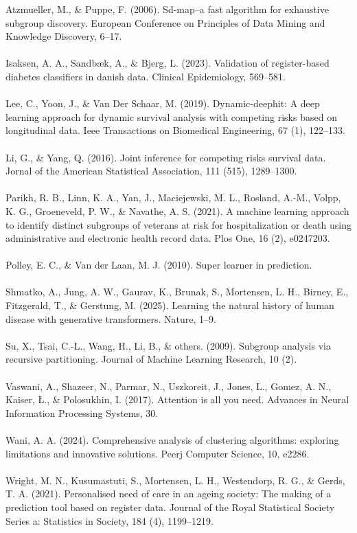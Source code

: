 \documentclass[11pt]{article}
\author{Hjalte Søberg Mikkelsen}
\date{\today}
\title{}
\begin{document}
\noindent
Atzmueller, M., \& Puppe, F. (2006). Sd-map–a fast algorithm for exhaustive
subgroup discovery. European Conference on Principles of Data Mining and
Knowledge Discovery, 6–17.\\[0pt]
\\[0pt]
Isaksen, A. A., Sandbæk, A., \& Bjerg, L. (2023). Validation of register-based
diabetes classifiers in danish data. Clinical Epidemiology, 569–581.\\[0pt]
\\[0pt]
Lee, C., Yoon, J., \& Van Der Schaar, M. (2019). Dynamic-deephit: A deep
learning approach for dynamic survival analysis with competing risks based
on longitudinal data. Ieee Transactions on Biomedical Engineering, 67 (1),
122–133.\\[0pt]
\\[0pt]
Li, G., \& Yang, Q. (2016). Joint inference for competing risks survival data.
Jornal of the American Statistical Association, 111 (515), 1289–1300.\\[0pt]
\\[0pt]
Parikh, R. B., Linn, K. A., Yan, J., Maciejewski, M. L., Rosland, A.-M., Volpp,
K. G., Groeneveld, P. W., \& Navathe, A. S. (2021). A machine learning
approach to identify distinct subgroups of veterans at risk for hospitalization
or death using administrative and electronic health record data. Plos One,
16 (2), e0247203.\\[0pt]
\\[0pt]
Polley, E. C., \& Van der Laan, M. J. (2010). Super learner in prediction.\\[0pt]
\\[0pt]
Shmatko, A., Jung, A. W., Gaurav, K., Brunak, S., Mortensen, L. H., Birney,
E., Fitzgerald, T., \& Gerstung, M. (2025). Learning the natural history of
human disease with generative transformers. Nature, 1–9.\\[0pt]
\\[0pt]
Su, X., Tsai, C.-L., Wang, H., Li, B., \& others. (2009). Subgroup analysis via
recursive partitioning. Journal of Machine Learning Research, 10 (2).\\[0pt]
\\[0pt]
Vaswani, A., Shazeer, N., Parmar, N., Uszkoreit, J., Jones, L., Gomez, A. N.,
Kaiser, Ł., \& Polosukhin, I. (2017). Attention is all you need. Advances in
Neural Information Processing Systems, 30.\\[0pt]
\\[0pt]
Wani, A. A. (2024). Comprehensive analysis of clustering algorithms: exploring
limitations and innovative solutions. Peerj Computer Science, 10, e2286.\\[0pt]
\\[0pt]
Wright, M. N., Kusumastuti, S., Mortensen, L. H., Westendorp, R. G., \& Gerds,
T. A. (2021). Personalised need of care in an ageing society: The making
of a prediction tool based on register data. Journal of the Royal Statistical
Society Series a: Statistics in Society, 184 (4), 1199–1219.
\noindent
\end{document}
